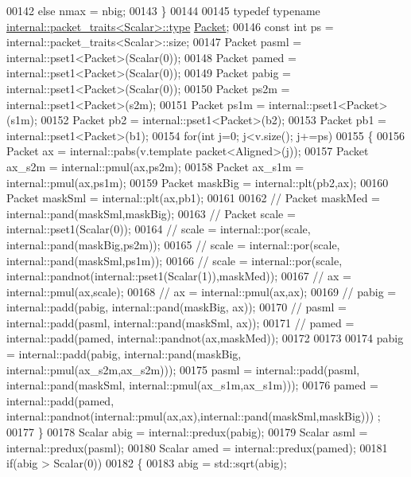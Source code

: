 \begin{DoxyCode}
00142     \textcolor{keywordflow}{else}                    nmax = nbig;
00143   \}
00144 
00145   \textcolor{keyword}{typedef} \textcolor{keyword}{typename} \hyperlink{group___sparse_core___module}{internal::packet\_traits<Scalar>::type} 
      \hyperlink{group___sparse_core___module}{Packet};
00146   \textcolor{keyword}{const} \textcolor{keywordtype}{int} ps = internal::packet\_traits<Scalar>::size;
00147   Packet pasml = internal::pset1<Packet>(Scalar(0));
00148   Packet pamed = internal::pset1<Packet>(Scalar(0));
00149   Packet pabig = internal::pset1<Packet>(Scalar(0));
00150   Packet ps2m = internal::pset1<Packet>(s2m);
00151   Packet ps1m = internal::pset1<Packet>(s1m);
00152   Packet pb2  = internal::pset1<Packet>(b2);
00153   Packet pb1  = internal::pset1<Packet>(b1);
00154   \textcolor{keywordflow}{for}(\textcolor{keywordtype}{int} j=0; j<v.size(); j+=ps)
00155   \{
00156     Packet ax = internal::pabs(v.template packet<Aligned>(j));
00157     Packet ax\_s2m = internal::pmul(ax,ps2m);
00158     Packet ax\_s1m = internal::pmul(ax,ps1m);
00159     Packet maskBig = internal::plt(pb2,ax);
00160     Packet maskSml = internal::plt(ax,pb1);
00161 
00162 \textcolor{comment}{//     Packet maskMed = internal::pand(maskSml,maskBig);}
00163 \textcolor{comment}{//     Packet scale = internal::pset1(Scalar(0));}
00164 \textcolor{comment}{//     scale = internal::por(scale, internal::pand(maskBig,ps2m));}
00165 \textcolor{comment}{//     scale = internal::por(scale, internal::pand(maskSml,ps1m));}
00166 \textcolor{comment}{//     scale = internal::por(scale, internal::pandnot(internal::pset1(Scalar(1)),maskMed));}
00167 \textcolor{comment}{//     ax = internal::pmul(ax,scale);}
00168 \textcolor{comment}{//     ax = internal::pmul(ax,ax);}
00169 \textcolor{comment}{//     pabig = internal::padd(pabig, internal::pand(maskBig, ax));}
00170 \textcolor{comment}{//     pasml = internal::padd(pasml, internal::pand(maskSml, ax));}
00171 \textcolor{comment}{//     pamed = internal::padd(pamed, internal::pandnot(ax,maskMed));}
00172 
00173 
00174     pabig = internal::padd(pabig, internal::pand(maskBig, internal::pmul(ax\_s2m,ax\_s2m)));
00175     pasml = internal::padd(pasml, internal::pand(maskSml, internal::pmul(ax\_s1m,ax\_s1m)));
00176     pamed = internal::padd(pamed, internal::pandnot(internal::pmul(ax,ax),internal::pand(maskSml,maskBig)))
      ;
00177   \}
00178   Scalar abig = internal::predux(pabig);
00179   Scalar asml = internal::predux(pasml);
00180   Scalar amed = internal::predux(pamed);
00181   \textcolor{keywordflow}{if}(abig > Scalar(0))
00182   \{
00183     abig = std::sqrt(abig);

\end{DoxyCode}
